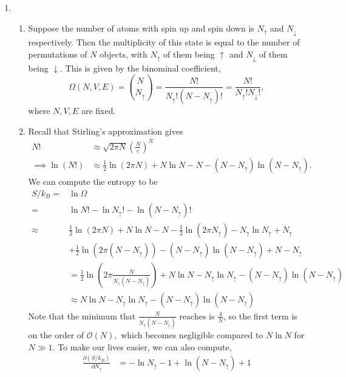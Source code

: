\documentclass{article}
\numberwithin{equation}{section}
\begin{document}
\begin{enumerate}
    \item \begin{enumerate}
        \item Suppose the number of atoms with spin up and spin down is $N_{\uparrow}$ and $N_{\downarrow}$ respectively. Then the multiplicity of this state is equal to the number of permutations of $N$ objects, with $N_{\uparrow}$ of them being $\uparrow$ and $N_{\downarrow}$ of them being $\downarrow$. This is given by the binominal coefficient,
        \begin{equation}
            \Omega(N,V,E) = \binom{N}{N_{\uparrow}} = \frac{N!}{N_{\uparrow}!(N-N_{\uparrow})!} = \frac{N!}{N_{\uparrow}!N_{\downarrow}!},
        \end{equation}
        where $N,V,E$ are fixed.
        \item Recall that Stirling's approximation gives
        \begin{align}
            N! &\approx \sqrt{2\pi N} \left(\frac{N}{e}\right)^N \\ 
            \implies \ln(N!) &\approx \frac{1}{2}\ln(2\pi N) + N\ln N - N - (N- N_\uparrow)\ln(N-N_\uparrow).
        \end{align}
        We can compute the entropy to be 
        \begin{align}
            S/k_B =& \ln \Omega \\ 
            =& \ln N! - \ln N_{\uparrow}! - \ln (N-N_\uparrow)! \\
            \approx& \frac{1}{2}\ln(2\pi N) + N\ln N - N - \frac{1}{2}\ln(2\pi N_{\uparrow}) - N_{\uparrow}\ln N_{\uparrow} + N_{\uparrow} \\ 
            &+ \frac{1}{2}\ln(2\pi (N-N_\uparrow)) - (N-N_\uparrow)\ln (N-N_\uparrow) + N - N_{\uparrow} \\
            &= \frac{1}{2}\ln \left(2\pi \frac{N}{N_\uparrow (N-N_\uparrow)}\right) + N\ln N - N_{\uparrow}\ln N_{\uparrow}  - (N-N_\uparrow)\ln (N-N_\uparrow) \\ 
            &\approx N\ln N - N_{\uparrow}\ln N_{\uparrow} - (N-N_\uparrow)\ln (N-N_\uparrow) 
        \end{align}
        Note that the minimum that $\frac{N}{N_{\uparrow}(N-N_{\uparrow})}$ reaches is $\frac{4}{N}$, so the first term is on the order of $\mathcal{O}(N),$ which becomes negligible compared to $N\ln N$ for $N \gg 1.$ To make our lives easier, we can also compute,
        \begin{align}
            \frac{\partial (S/k_B)}{\partial N_{\uparrow}} &= -\ln N_{\uparrow} -1 + \ln(N-N_{\uparrow}) + 1 \\ 

\end{align}
\end{enumerate}
\end{enumerate}
\end{document}

